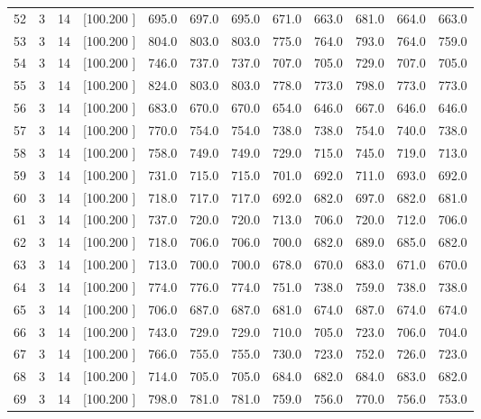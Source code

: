 \documentclass[12pt,a4paper]{article}
\begin{document}
\begin{center}
{\begin{tabular}{r r r r r r r r r r r r}
  52&  3& 14&[100.200   ]&   695.0&   697.0&   695.0&   671.0&   663.0&   681.0&   664.0&   663.0\\[-0.02in]
  53&  3& 14&[100.200   ]&   804.0&   803.0&   803.0&   775.0&   764.0&   793.0&   764.0&   759.0\\[-0.02in]
  54&  3& 14&[100.200   ]&   746.0&   737.0&   737.0&   707.0&   705.0&   729.0&   707.0&   705.0\\[-0.02in]
  55&  3& 14&[100.200   ]&   824.0&   803.0&   803.0&   778.0&   773.0&   798.0&   773.0&   773.0\\[-0.02in]
  56&  3& 14&[100.200   ]&   683.0&   670.0&   670.0&   654.0&   646.0&   667.0&   646.0&   646.0\\[-0.02in]
  57&  3& 14&[100.200   ]&   770.0&   754.0&   754.0&   738.0&   738.0&   754.0&   740.0&   738.0\\[-0.02in]
  58&  3& 14&[100.200   ]&   758.0&   749.0&   749.0&   729.0&   715.0&   745.0&   719.0&   713.0\\[-0.02in]
  59&  3& 14&[100.200   ]&   731.0&   715.0&   715.0&   701.0&   692.0&   711.0&   693.0&   692.0\\[-0.02in]
  60&  3& 14&[100.200   ]&   718.0&   717.0&   717.0&   692.0&   682.0&   697.0&   682.0&   681.0\\[-0.02in]
  61&  3& 14&[100.200   ]&   737.0&   720.0&   720.0&   713.0&   706.0&   720.0&   712.0&   706.0\\[-0.02in]
  62&  3& 14&[100.200   ]&   718.0&   706.0&   706.0&   700.0&   682.0&   689.0&   685.0&   682.0\\[-0.02in]
  63&  3& 14&[100.200   ]&   713.0&   700.0&   700.0&   678.0&   670.0&   683.0&   671.0&   670.0\\[-0.02in]
  64&  3& 14&[100.200   ]&   774.0&   776.0&   774.0&   751.0&   738.0&   759.0&   738.0&   738.0\\[-0.02in]
  65&  3& 14&[100.200   ]&   706.0&   687.0&   687.0&   681.0&   674.0&   687.0&   674.0&   674.0\\[-0.02in]
  66&  3& 14&[100.200   ]&   743.0&   729.0&   729.0&   710.0&   705.0&   723.0&   706.0&   704.0\\[-0.02in]
  67&  3& 14&[100.200   ]&   766.0&   755.0&   755.0&   730.0&   723.0&   752.0&   726.0&   723.0\\[-0.02in]
  68&  3& 14&[100.200   ]&   714.0&   705.0&   705.0&   684.0&   682.0&   684.0&   683.0&   682.0\\[-0.02in]
  69&  3& 14&[100.200   ]&   798.0&   781.0&   781.0&   759.0&   756.0&   770.0&   756.0&   753.0\\[-0.02in]

\end{tabular}}
\end{center}
\end{document}
